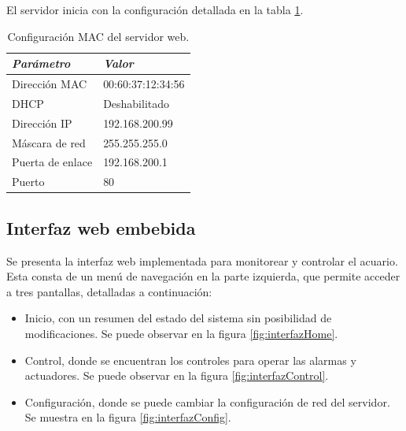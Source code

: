  
%

El servidor inicia con la configuración detallada en la tabla \ref{tab:config}.

\begin{table}[ht]
	\centering
	\caption{Configuración MAC del servidor web.}
	\begin{tabular}{@{} l l  @{}}    \toprule
		\emph{\textbf{Parámetro}} & \emph{\textbf{Valor}}  \\
		\midrule
		Dirección MAC	& 00:60:37:12:34:56 	\\
		DHCP				& Deshabilitado		\\ 		
		Dirección IP		& 192.168.200.99		\\
		Máscara de red	& 255.255.255.0		\\ 
		Puerta de enlace	& 192.168.200.1		\\ 
		Puerto			& 80					\\ 
		\bottomrule
		\hline
	\end{tabular}
	\label{tab:config}
\end{table}

\subsection{Interfaz web embebida}
\label{sec:interfaz-web}

Se presenta la interfaz web implementada para monitorear y controlar el acuario.  Esta consta de un menú de navegación en la parte izquierda, que permite acceder a tres pantallas, detalladas a continuación:

\begin{itemize}
\item Inicio, con un resumen del estado del sistema sin posibilidad de modificaciones. Se puede observar en la figura \ref{fig:interfazHome}.
\item Control, donde se encuentran los controles para operar las alarmas y actuadores. Se puede observar en la figura \ref{fig:interfazControl}.
\item Configuración, donde se puede cambiar la configuración de red del servidor. Se muestra en la figura \ref{fig:interfazConfig}. 
\end{itemize}

